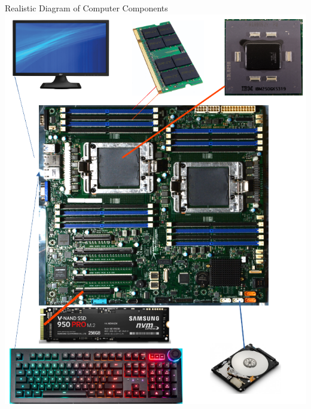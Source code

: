 \documentclass[graphics]{beamer}
\begin{document}
\begin{frame}{Realistic Diagram of Computer Components}
\centering
    \includegraphics[scale=0.25]{L02_ArchNumbersSystems/L2_p8.png}
\end{frame}
\end{document}
